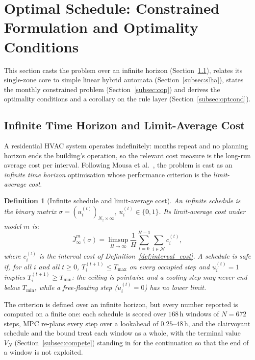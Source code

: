 \documentclass[3p,twocolumn,number]{elsarticle}
\newtheorem{definition}{Definition} \newtheorem{proposition}{Proposition} \newtheorem{remark}{Remark} \newtheorem{observation}{Observation} \newtheorem{corollary}{Corollary}
\newcommand{\sched}{\sigma}
\newcommand{\Tmin}{T_{\min}}
\newcommand{\Tmax}{T_{\max}}
\begin{document}
\section{Optimal Schedule: Constrained Formulation and Optimality Conditions}
\label{sec:schedule}

This section casts the problem over an infinite horizon (Section~\ref{subsec:infinite}), relates its single-zone core to simple linear hybrid automata (Section~\ref{subsec:slha}), states the monthly constrained problem (Section~\ref{subsec:cop}) and derives the optimality conditions and a corollary on the rule layer (Section~\ref{subsec:optcond}).
 
\subsection{Infinite Time Horizon and Limit-Average Cost}
\label{subsec:infinite}
 
A residential HVAC system operates indefinitely: months repeat and no planning horizon ends the building's operation, so the relevant cost measure is the long-run average cost per interval. Following Mousa et al.~\cite{Mousa2016}, the problem is cast as an \emph{infinite time horizon} optimisation whose performance criterion is the \emph{limit-average cost}.
 
\begin{definition}[Infinite schedule and limit-average cost]
\label{def:inf_schedule}
An \emph{infinite schedule} is the binary matrix $\sched=(u_i^{(t)})_{N_z\times\infty}$, $u_i^{(t)}\in\{0,1\}$. Its limit-average cost under model $m$ is:
\begin{equation}
  \bar{J}^m_\infty(\sched)
  = \limsup_{H\to\infty}
    \frac{1}{H}\sum_{t=0}^{H-1}\sum_{i\in\mathcal{N}} c_i^{(t)},
  \label{eq:limsup}
\end{equation}
where $c_i^{(t)}$ is the interval cost of Definition~\ref{def:interval_cost}. A schedule is \emph{safe} if, for all $i$ and all $t\ge0$, $T_i^{(t+1)}\le\Tmax$ on every occupied step and $u_i^{(t)}=1$ implies $T_i^{(t+1)}\ge\Tmin$: the ceiling is pointwise and a cooling step may never end below $\Tmin$, while a free-floating step ($u_i^{(t)}=0$) has no lower limit.
\end{definition}

The criterion is defined over an infinite horizon, but every number reported is computed on a finite one: each schedule is scored over $168\,$h windows of $N=672$ steps, MPC re-plans every step over a lookahead of $0.25$--$48\,$h, and the clairvoyant schedule and the bound treat each window as a whole, with the terminal value $V_N$ (Section~\ref{subsec:compete}) standing in for the continuation so that the end of a window is not exploited.
\end{document}
